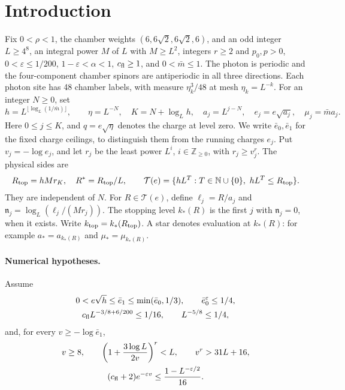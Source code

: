 
\section{Introduction}\label{sec:introduction}
Fix \(0<\rho<1\), the chamber weights \((6,6\sqrt2,6\sqrt2,6)\),
and an odd integer \(L\ge4^8\), an integral power \(M\) of \(L\) with
\(M\ge L^2\), integers \(r\ge2\) and \(p_0,p>0\), \(0<\varepsilon\le1/200\),
\(1-\varepsilon<\alpha<1\), \(c_{\rm fl}\ge1\), and \(0<\bar m\le1\).
The photon is periodic and the four-component chamber spinors are
antiperiodic in all three directions. Each photon site has 48 chamber
labels, with measure \(\eta_k^3/48\) at mesh \(\eta_k=L^{-k}\).
For an integer \(N\ge0\), set
\[
 h=L^{\lfloor\log_L(1/\bar m)\rfloor},\qquad
 \eta=L^{-N},\quad K=N+\log_Lh,\quad
 a_j=L^{j-N},\quad e_j=e\sqrt{a_j},\quad \mu_j=\bar m a_j.
\]
Here \(0\le j\le K\), and \(q=e\sqrt\eta\) denotes the charge at
level zero. We write \(\bar e_0,\bar e_1\) for the fixed charge
ceilings, to distinguish them from the running charges \(e_j\).
Put \(v_j=-\log e_j\), and let \(r_j\) be the least power \(L^i\),
\(i\in\mathbb Z_{\ge0}\), with \(r_j\ge v_j^r\). The physical sides are
\[
 R_{\rm top}=hMr_K,\quad R^*=R_{\rm top}/L,\qquad
 \mathcal T(e)=\{hL^T:T\in\mathbb N\cup\{0\},\ hL^T\le R_{\rm top}\}.
\]
They are independent of \(N\). For \(R\in\mathcal T(e)\), define
\(\ell_j=R/a_j\) and
\(\mathfrak n_j=\log_L(\ell_j/(Mr_j))\). The stopping level \(k_*(R)\)
is the first \(j\) with \(\mathfrak n_j=0\), when it exists.
Write \(k_{\rm top}=k_*(R_{\rm top})\). A star denotes evaluation
at \(k_*(R)\): for example \(a_*=a_{k_*(R)}\) and
\(\mu_*=\mu_{k_*(R)}\).

\paragraph{Numerical hypotheses.}
Assume
\[
 \begin{gathered}
 0<e\sqrt h\le\bar e_1\le\min(\bar e_0,1/3),\qquad
 \bar e_0^\varepsilon\le1/4,\\
 c_{\rm fl}L^{-3/8+6/200}\le1/16,\qquad L^{-5/8}\le1/4,
 \end{gathered}
\]
and, for every \(v\ge-\log\bar e_1\),
\begin{equation}\label{eq:cv-scale-conditions}
 \begin{gathered}
 v\ge8,\qquad
 \left(1+\frac{3\log L}{2v}\right)^r<L,\qquad
 v^r>31L+16,\\
 (c_{\rm fl}+2)e^{-\varepsilon v}
       \le\frac{1-L^{-\varepsilon/2}}{16}.
 \end{gathered}
\end{equation}

